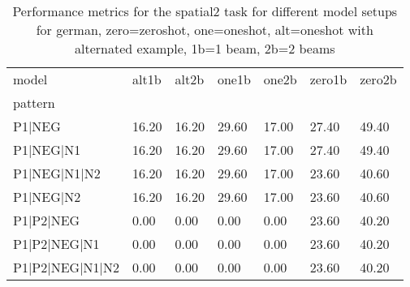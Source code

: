 \begin{table}[h]
\begin{tabular}{l|llllll}
\toprule
model & alt1b & alt2b & one1b & one2b & zero1b & zero2b \\
pattern &  &  &  &  &  &  \\
\midrule
P1|NEG & 16.20 & 16.20 & 29.60 & 17.00 & 27.40 & 49.40 \\
P1|NEG|N1 & 16.20 & 16.20 & 29.60 & 17.00 & 27.40 & 49.40 \\
P1|NEG|N1|N2 & 16.20 & 16.20 & 29.60 & 17.00 & 23.60 & 40.60 \\
P1|NEG|N2 & 16.20 & 16.20 & 29.60 & 17.00 & 23.60 & 40.60 \\
P1|P2|NEG & 0.00 & 0.00 & 0.00 & 0.00 & 23.60 & 40.20 \\
P1|P2|NEG|N1 & 0.00 & 0.00 & 0.00 & 0.00 & 23.60 & 40.20 \\
P1|P2|NEG|N1|N2 & 0.00 & 0.00 & 0.00 & 0.00 & 23.60 & 40.20 \\
\bottomrule
\end{tabular}
\caption{Performance metrics for the spatial2 task for different model setups for german, zero=zeroshot, one=oneshot, alt=oneshot with alternated example, 1b=1 beam, 2b=2 beams}
\label{tab:de_spatial2_performance}
\end{table}
